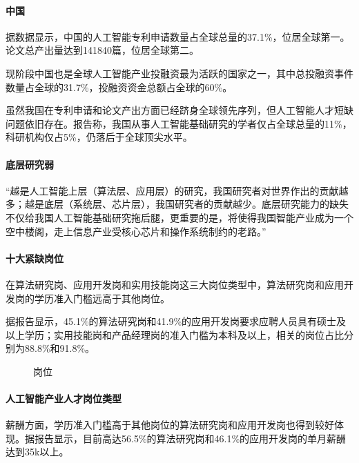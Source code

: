 \documentclass[letterpaper,11pt,english]{sphinxmanual}
\begin{document}
\paragraph{中国}
\label{\detokenize{chapter_project/AI_talents:id3}}
据数据显示，中国的人工智能专利申请数量占全球总量的37.1\%，位居全球第一。论文总产出量达到141840篇，位居全球第二。

现阶段中国也是全球人工智能产业投融资最为活跃的国家之一，其中总投融资事件数量占全球的31.7\%，投融资资金总额占全球的60\%。

虽然我国在专利申请和论文产出方面已经跻身全球领先序列，但人工智能人才短缺问题依旧存在。报告称，我国从事人工智能基础研究的学者仅占全球总量的11\%，科研机构仅占5\%，仍落后于全球顶尖水平。%
\begin{footnote}[669]\sphinxAtStartFootnote
{}
%
\end{footnote}


\paragraph{底层研究弱}
\label{\detokenize{chapter_project/AI_talents:id4}}
“越是人工智能上层（算法层、应用层）的研究，我国研究者对世界作出的贡献越多；越是底层（系统层、芯片层），我国研究者的贡献越少。底层研究能力的缺失不仅给我国人工智能基础研究拖后腿，更重要的是，将使得我国智能产业成为一个空中楼阁，走上信息产业受核心芯片和操作系统制约的老路。”


\paragraph{十大紧缺岗位}
\label{\detokenize{chapter_project/AI_talents:id5}}
在算法研究岗、应用开发岗和实用技能岗这三大岗位类型中，算法研究岗和应用开发岗的学历准入门槛远高于其他岗位。

据报告显示，45.1\%的算法研究岗和41.9\%的应用开发岗要求应聘人员具有硕士及以上学历；实用技能岗和产品经理岗的准入门槛为本科及以上，相关的岗位占比分别为88.8\%和91.8\%。

\begin{figure}[H]
\centering
\capstart

\noindent{}
\caption{岗位}\label{\detokenize{chapter_project/AI_talents:id19}}\end{figure}


\paragraph{人工智能产业人才岗位类型}
\label{\detokenize{chapter_project/AI_talents:id6}}
薪酬方面，学历准入门槛高于其他岗位的算法研究岗和应用开发岗也得到较好体现。据报告显示，目前高达56.5\%的算法研究岗和46.1\%的应用开发岗的单月薪酬达到35k以上。
\end{document}
